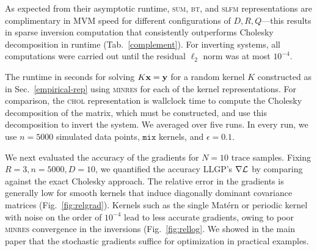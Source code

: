 \documentclass{article}
\begin{document}
As expected from their asymptotic runtime, \textsc{sum}, \textsc{bt}, and \textsc{slfm} representations are complimentary in MVM speed for different configurations of $D,R,Q$---this results in sparse inversion computation that consistently outperforms Cholesky decomposition in runtime (Tab.~\ref{complement}).
For inverting systems, all computations were carried out until the residual $\ell_2$ norm was at most $10^{-4}$.
\begin{table}[!ht]
  \caption{The runtime in seconds for solving $K\textbf{x}=\textbf{y}$ for a random kernel $K$ constructed as in Sec.~\ref{empirical-rep} using \textsc{minres} for each of the kernel representations. For comparison, the \textsc{chol} representation is wallclock time to compute the Cholesky decomposition of the matrix, which must be constructed, and use this decomposition to invert the system. We averaged over five runs. In every run, we use $n=5000$ simulated data points, $\texttt{mix}$ kernels, and $\epsilon=0.1$.
}
\label{complement}
\begin{center}
  \begin{small}
    
\end{small}
\end{center}
\end{table}

We next evaluated the accuracy of the gradients for $N=10$ trace samples. Fixing $R=3,n=5000,D=10$, we quantified the accuracy LLGP's $\nabla\mathcal{L}$ by comparing against the exact Cholesky approach. The relative error in the gradients is generally low for smooth kernels that induce diagonally dominant covariance matrices (Fig.~\ref{fig:relgrad}). Kernels such as the single Mat\'{e}rn or periodic kernel with noise on the order of $10^{-4}$ lead to less accurate gradients, owing to poor \textsc{minres} convergence in the inversions (Fig.~\ref{fig:rellog}. We showed in the main paper that the stochastic gradients suffice for optimization in practical examples.
\end{document}
